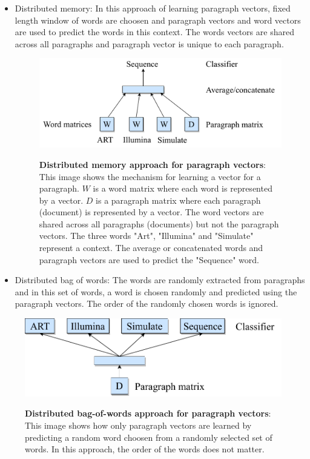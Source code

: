 \begin{itemize}
\item Distributed memory: In this approach of learning paragraph vectors, fixed length window of words are choosen and paragraph vectors and word vectors are used to predict the words in this context. The words vectors are shared across all paragraphs and paragraph vector is unique to each paragraph.

\begin{figure}[h]
\begin{centering}
    {\includegraphics[scale=0.7]{figures/dm_pv.pdf}}
    \caption[Distributed memory approach for paragraph vectors]{\textbf{Distributed memory approach for paragraph vectors}: This image shows the mechanism for learning a vector for a paragraph. $W$ is a word matrix where each word is represented by a vector. $D$ is a paragraph matrix where each paragraph (document) is represented by a vector. The word vectors are shared across all paragraphs (documents) but not the paragraph vectors. The three words "Art", "Illumina" and "Simulate" represent a context. The average or concatenated words and paragraph vectors are used to predict the "Sequence" word.}
\end{centering}
\end{figure}

\item Distributed bag of words: The words are randomly extracted from paragraphs and in this set of words, a word is chosen randomly and predicted using the paragraph vectors. The order of the randomly chosen words is ignored.  
\end{itemize}

\begin{figure}[h]
\begin{centering}
    {\includegraphics[scale=0.7]{figures/dbow_pv.pdf}}
    \caption[Distributed bag-of-words approach for paragraph vectors]{\textbf{Distributed bag-of-words approach for paragraph vectors}: This image shows how only paragraph vectors are learned by predicting a random word choosen from a randomly selected set of words. In this approach, the order of the words does not matter.}
\end{centering}
\end{figure}

